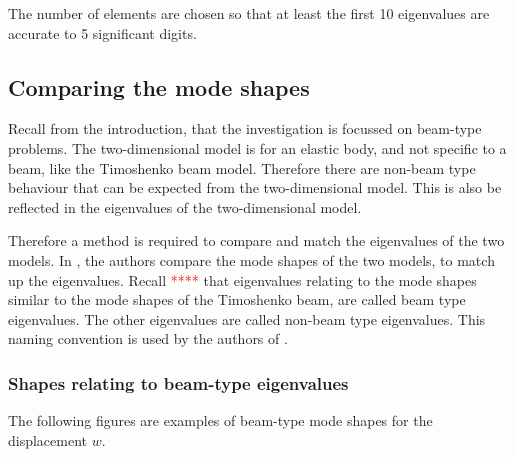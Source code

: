\documentclass[../../main.tex]{subfiles}
\begin{document}
The number of elements are chosen so that at least the first 10 eigenvalues are accurate to 5 significant digits.

\subsection{Comparing the mode shapes}
Recall from the introduction, that the investigation is focussed on beam-type problems. The two-dimensional model is for an elastic body, and not specific to a beam, like the Timoshenko beam model. Therefore there are non-beam type behaviour that can be expected from the two-dimensional model. This is also be reflected in the eigenvalues of the two-dimensional model.

Therefore a method is required to compare and match the eigenvalues of the two models. In \cite{LVV09}, the authors compare the mode shapes of the two models, to match up the eigenvalues. Recall \textcolor{red}{****} that eigenvalues relating to the mode shapes similar to the mode shapes of the Timoshenko beam, are called beam type eigenvalues. The other eigenvalues are called non-beam type eigenvalues. This naming convention is used by the authors of \cite{LVV09}.

\subsubsection{Shapes relating to beam-type eigenvalues}
The following figures are examples of beam-type mode shapes for the displacement $w$.
\end{document}
